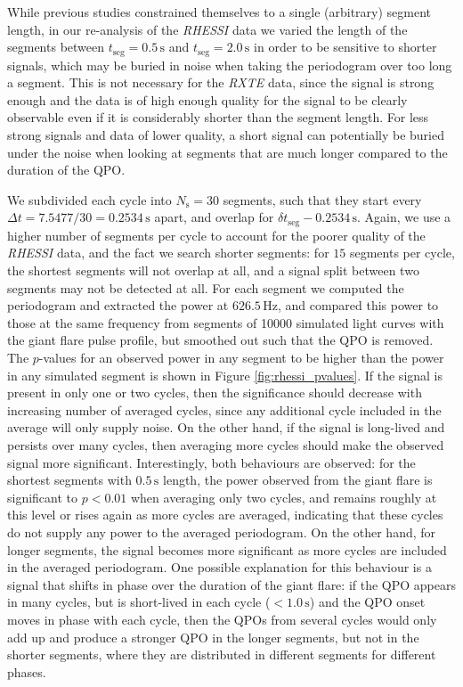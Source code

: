 \documentclass{emulateapj}
\begin{document}
While previous studies constrained themselves to a single (arbitrary) segment length, in our re-analysis of the {\it RHESSI} data we varied the length of the segments between $t_{\mathrm{seg}} = 0.5 \, \mathrm{s}$ and $t_{\mathrm{seg}} = 2.0 \, \mathrm{s}$  in order to be sensitive to shorter signals, which may be buried in noise when taking the periodogram over too long a segment. This is not necessary for the {\it RXTE} data, since the signal is strong enough and the data is of high enough quality for the signal to be clearly observable even if it is considerably shorter than the segment length. For less strong signals and data of lower quality, a short signal can potentially be buried under the noise when looking at segments that are much longer compared to the duration of the QPO. 

We subdivided each cycle into $N_\mathrm{s} = 30$ segments, such that they start every $\Delta t = 7.5477/30 = 0.2534 \, \mathrm{s}$ apart, and overlap for $\delta t_\mathrm{seg} - 0.2534 \, \mathrm{s}$. Again, we use a higher number of segments per cycle to account for the poorer quality of the {\it RHESSI} data, and the fact we search shorter segments: for $15$ segments per cycle, the shortest segments will not overlap at all, and a signal split between two segments may not be detected at all.
For each segment we computed the periodogram and extracted the power at $626.5 \, \mathrm{Hz}$, and compared this power to those at the same frequency from segments of 10000 simulated light curves with the giant flare pulse profile, but smoothed out such that the QPO is removed. The $p$-values for an observed power in any segment to be higher than the power in any simulated segment is shown in Figure \ref{fig:rhessi_pvalues}. If the signal is present in only one or two cycles, then the significance should decrease with increasing number of averaged cycles, since any additional cycle included in the average will only supply noise. On the other hand, if the signal is long-lived and persists over many cycles, then averaging more cycles should make the observed signal more significant. Interestingly, both behaviours are observed: for the shortest segments with $0.5\, \mathrm{s}$ length, the power observed from the giant flare is significant to $p < 0.01$ when averaging only two cycles, and remains roughly at this level or rises again as more cycles are averaged, indicating that these cycles do not supply any power to the averaged periodogram. On the other hand, for longer segments, the signal becomes more significant as more cycles are included in the averaged periodogram. One possible explanation for this behaviour is a signal that shifts in phase over the duration of the giant flare: if the QPO appears in many cycles, but is short-lived in each cycle ($<1.0 \, \mathrm{s}$) and the QPO onset moves in phase with each cycle, then the QPOs from several cycles would only add up and produce a stronger QPO in the longer segments, but not in the shorter segments, where they are distributed in different segments for different phases. 
\end{document}

